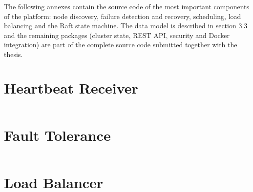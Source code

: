 
The following annexes contain the source code of the most important components of the platform: node discovery, failure detection and recovery, scheduling, load balancing and the Raft state machine. The data model is described in section 3.3 and the remaining packages (cluster state, REST API, security and Docker integration) are part of the complete source code submitted together with the thesis.

\section{Heartbeat Receiver}
\label{anexa1:receiver}

\begin{code}
    \inputminted{go}{../internal/heartbeat/receiver.go}
    \caption{internal/heartbeat/receiver.go -- UDP multicast receiver with auto-join}
    \label{code:receiver}
\end{code}

\section{Fault Tolerance}
\label{anexa2:fault}

\begin{code}
    \inputminted{go}{../internal/fault/tolerance.go}
    \caption{internal/fault/tolerance.go -- Failure detection and recovery}
    \label{code:fault}
\end{code}

\section{Load Balancer}
\label{anexa3:loadbalancer}

\begin{code}
    \inputminted{go}{../internal/loadbalancer/balancer.go}
    \caption{internal/loadbalancer/balancer.go -- LoadBalancer interface}
    \label{code:lb_interface}
\end{code}

\begin{code}
    \inputminted{go}{../internal/loadbalancer/leastconn.go}
    \caption{internal/loadbalancer/leastconn.go -- Least Connections strategy}
    \label{code:lb_leastconn}
\end{code}

\begin{code}
    \inputminted{go}{../internal/loadbalancer/weighted.go}
    \caption{internal/loadbalancer/weighted.go -- Weighted strategy}
    \label{code:lb_weighted}
\end{code}

